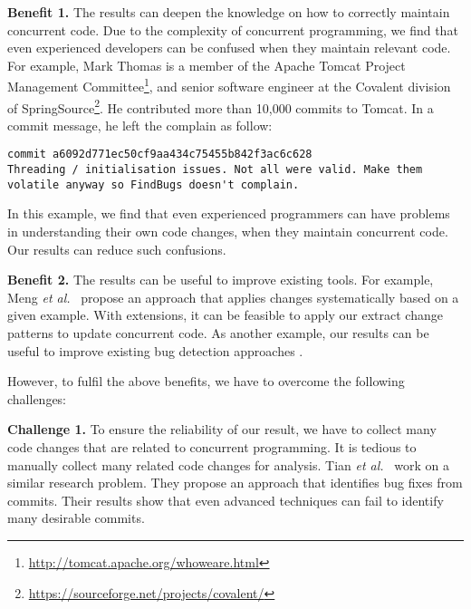 \noindent
\textbf{Benefit 1.} The results can deepen the knowledge on how to correctly maintain concurrent code. Due to the complexity of concurrent programming, we find that even experienced developers can be confused when they maintain relevant code. For example, Mark Thomas is a member of the Apache Tomcat Project Management Committee\footnote{\url{http://tomcat.apache.org/whoweare.html}}, and senior software engineer at the Covalent division of SpringSource\footnote{\url{https://sourceforge.net/projects/covalent/}}. He contributed more than 10,000 commits to Tomcat. In a commit message, he left the complain as follow:

\lstset{numbers=left, breaklines=true,  basicstyle=\ttfamily\tiny,  xleftmargin=3em, tabsize=2}
\begin{lstlisting}
commit a6092d771ec50cf9aa434c75455b842f3ac6c628
Threading / initialisation issues. Not all were valid. Make them volatile anyway so FindBugs doesn't complain.
\end{lstlisting}

\noindent
In this example, we find that even experienced programmers can have problems in understanding their own code changes, when they maintain concurrent code. Our results can reduce such confusions.


\noindent
\textbf{Benefit 2.} The results can be useful to improve existing tools. For example, Meng \emph{et al.}~\cite{conf/pldi/MengKM11} propose an approach that applies changes systematically based on a given example. With extensions, it can be feasible to apply our extract change patterns to update concurrent code. As another example, our results can be useful to improve existing bug detection approaches \cite{conf/ppopp/SamakR14, conf/sigsoft/EslamimehrP14}.

However, to fulfil the above benefits, we have to overcome the following challenges:

\noindent
\textbf{Challenge 1.} To ensure the reliability of our result, we have to collect many code changes that are related to concurrent programming. It is tedious to manually collect many related code changes for analysis. Tian \emph{et al.}~\cite{tian2012identifying} work on a similar research problem. They propose an approach that identifies bug fixes from commits. Their results show that even advanced techniques can fail to identify many desirable commits.


